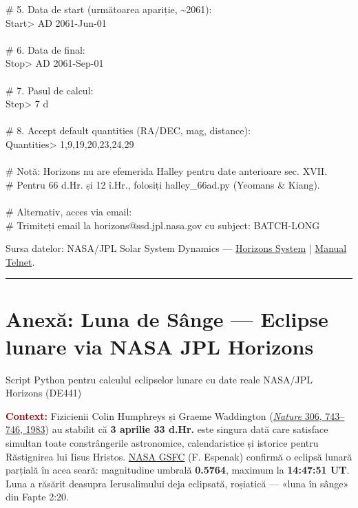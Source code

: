 \documentclass[12pt,a4paper,twoside,openany]{book}
\begin{document}
\# 5. Data de start (următoarea apariție, \textasciitilde{}2061): \\

Start> AD 2061-Jun-01 \\
 \\

\# 6. Data de final: \\

Stop> AD 2061-Sep-01 \\
 \\

\# 7. Pasul de calcul: \\

Step> 7 d \\
 \\

\# 8. Accept default quantities (RA/DEC, mag, distance): \\

Quantities> 1,9,19,20,23,24,29 \\
 \\

\# Notă: Horizons nu are efemerida Halley pentru date anterioare sec. XVII. \\

\# Pentru 66 d.Hr. și 12 î.Hr., folosiți halley\_66ad.py (Yeomans \& Kiang). \\
 \\

\# Alternativ, acces via email: \\

\# Trimiteți email la horizons@ssd.jpl.nasa.gov cu subject: BATCH-LONG

Sursa datelor: NASA/JPL Solar System Dynamics — \href{https://ssd.jpl.nasa.gov/horizons/}{Horizons System} | \href{https://ssd.jpl.nasa.gov/horizons/manual.html}{Manual Telnet}.


\bigskip\noindent\textcolor{darkred}{\rule{\textwidth}{2pt}}\bigskip

\chapter{Anexă: Luna de Sânge — Eclipse lunare via NASA JPL Horizons}\label{bloodmoon}
Script Python pentru calculul eclipselor lunare cu date reale NASA/JPL Horizons (DE441)

\begin{infobox}

\textcolor{darkred}{\textbf{Context:}} Fizicienii Colin Humphreys și Graeme Waddington (\href{https://www.nature.com/articles/306743a0}{\textit{Nature} 306, 743–746, 1983}) au stabilit că \textbf{3 aprilie 33 d.Hr.} este singura dată care satisface simultan toate constrângerile astronomice, calendaristice și istorice pentru Răstignirea lui Iisus Hristos. \href{https://eclipse.gsfc.nasa.gov/LEhistory/LEplot/LE0033Apr03P.pdf}{NASA GSFC} (F. Espenak) confirmă o eclipsă lunară parțială în acea seară: magnitudine umbrală \textbf{0.5764}, maximum la \textbf{14:47:51 UT}. Luna a răsărit deasupra Ierusalimului deja eclipsată, roșiatică — «luna în sânge» din Fapte 2:20.

\end{infobox}
\end{document}
